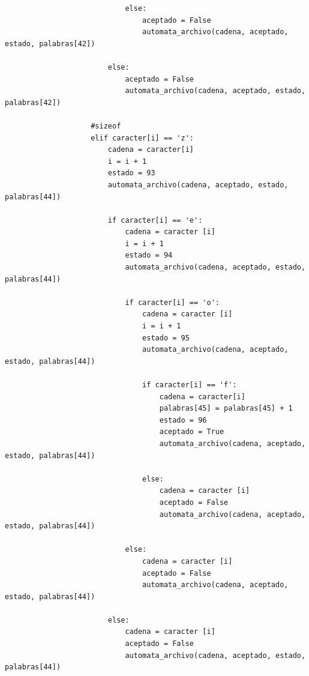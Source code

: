 \documentclass{article}
\begin{document}
\begin{flushleft}
\begin{lstlisting}
                            else:
                                aceptado = False
                                automata_archivo(cadena, aceptado, estado, palabras[42])
                                
                        else:
                            aceptado = False
                            automata_archivo(cadena, aceptado, estado, palabras[42])
                            
                    #sizeof
                    elif caracter[i] == 'z':
                        cadena = caracter[i]
                        i = i + 1
                        estado = 93
                        automata_archivo(cadena, aceptado, estado, palabras[44])
                        
                        if caracter[i] == 'e':
                            cadena = caracter [i]
                            i = i + 1
                            estado = 94
                            automata_archivo(cadena, aceptado, estado, palabras[44])   
                            
                            if caracter[i] == 'o':
                                cadena = caracter [i]
                                i = i + 1
                                estado = 95
                                automata_archivo(cadena, aceptado, estado, palabras[44])
                                
                                if caracter[i] == 'f':
                                    cadena = caracter[i]
                                    palabras[45] = palabras[45] + 1
                                    estado = 96
                                    aceptado = True
                                    automata_archivo(cadena, aceptado, estado, palabras[44])
                                    
                                else:
                                    cadena = caracter [i]
                                    aceptado = False
                                    automata_archivo(cadena, aceptado, estado, palabras[44])
                                    
                            else:
                                cadena = caracter [i]
                                aceptado = False
                                automata_archivo(cadena, aceptado, estado, palabras[44])
                        
                        else:
                            cadena = caracter [i]
                            aceptado = False
                            automata_archivo(cadena, aceptado, estado, palabras[44])
                    

\end{lstlisting}
\end{flushleft}
\end{document}
